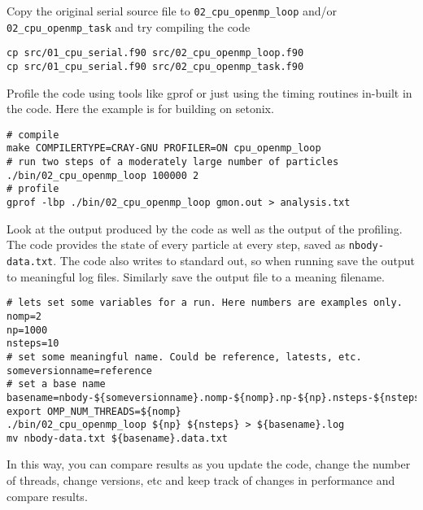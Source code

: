 \documentclass[11pt]{amsart}
\begin{document}
Copy the original serial source file to \texttt{02\_cpu\_openmp\_loop} and/or \texttt{02\_cpu\_openmp\_task} and try compiling the code
\begin{center}
\begin{minipage}{0.95\textwidth}
\begin{verbatim}
cp src/01_cpu_serial.f90 src/02_cpu_openmp_loop.f90
cp src/01_cpu_serial.f90 src/02_cpu_openmp_task.f90
\end{verbatim}
\end{minipage}
\end{center}
Profile the code using tools like gprof or just using the timing routines in-built in the code. 
Here the example is for building on setonix.
\begin{center}
\begin{minipage}{0.95\textwidth}
\begin{verbatim}
# compile
make COMPILERTYPE=CRAY-GNU PROFILER=ON cpu_openmp_loop
# run two steps of a moderately large number of particles 
./bin/02_cpu_openmp_loop 100000 2
# profile
gprof -lbp ./bin/02_cpu_openmp_loop gmon.out > analysis.txt
\end{verbatim}
\end{minipage}
\end{center}
Look at the output produced by the code as well as the output of the profiling. The code provides the state of every particle at every step, saved as {\color{blue}\texttt{nbody-data.txt}}. The code also writes to standard out, so when running save the output to meaningful log files. Similarly save the output file to a meaning filename.
\begin{center}
\begin{minipage}{0.95\textwidth}
\begin{verbatim}
# lets set some variables for a run. Here numbers are examples only.
nomp=2
np=1000
nsteps=10
# set some meaningful name. Could be reference, latests, etc.
someversionname=reference
# set a base name
basename=nbody-${someversionname}.nomp-${nomp}.np-${np}.nsteps-${nsteps}
export OMP_NUM_THREADS=${nomp}
./bin/02_cpu_openmp_loop ${np} ${nsteps} > ${basename}.log
mv nbody-data.txt ${basename}.data.txt
\end{verbatim}
\end{minipage}
\end{center}
In this way, you can compare results as you update the code, change the number of threads, change versions, etc and keep track of changes in performance and compare results.
\end{document}

